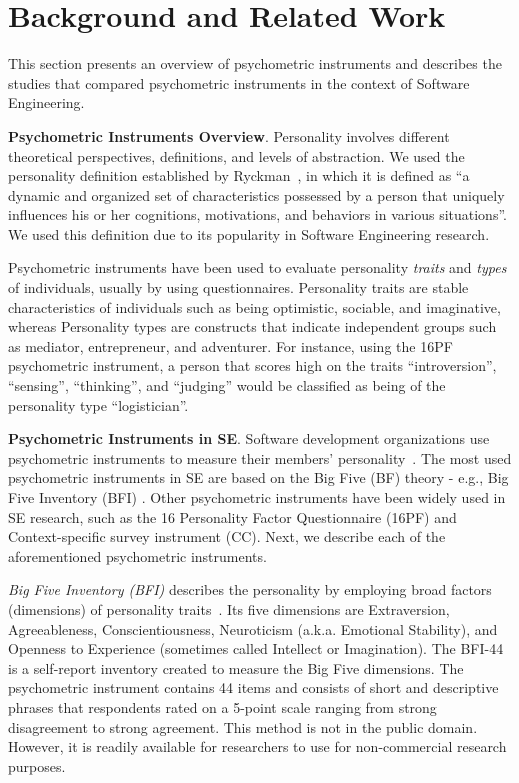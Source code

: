 \section{Background and Related Work}
\label{BACKGROUND}

This section presents an overview of psychometric instruments and describes the studies that compared psychometric instruments in the context of Software Engineering.

\textbf{Psychometric Instruments Overview}. Personality involves different theoretical perspectives, definitions, and levels of abstraction. We used the personality definition established by Ryckman~\cite{ryckman2012theories}, in which it is defined as ``a dynamic and organized set of characteristics possessed by a person that uniquely influences his or her cognitions, motivations, and behaviors in various situations''. We used this definition due to its popularity in Software Engineering research. 

Psychometric instruments have been used to evaluate personality \textit{traits} and \textit{types} of individuals, usually by using questionnaires. Personality traits are stable characteristics of individuals such as being optimistic, sociable, and imaginative, whereas Personality types are constructs that indicate independent groups such as mediator, entrepreneur, and adventurer. For instance, using the 16PF psychometric instrument, a person that scores high on the traits ``introversion'', ``sensing'', ``thinking'', and ``judging'' would be classified as being of the personality type ``logistician''.

\textbf{Psychometric Instruments in SE}. Software development organizations use psychometric instruments to measure their members' personality~\cite{lounsbury2007investigation, wyrich2019theory}. The most used psychometric instruments in SE are based on the Big Five (BF) theory - e.g., Big Five Inventory (BFI) \cite{cruz2015forty}. Other psychometric instruments have been widely used in SE research, such as the 16 Personality Factor Questionnaire (16PF) and Context-specific survey instrument (CC). Next, we describe each of the aforementioned psychometric instruments.

\textit{Big Five Inventory (BFI)} describes the personality by employing broad factors (dimensions) of personality traits~\cite{costa2010neo}. Its five dimensions are Extraversion, Agreeableness, Conscientiousness, Neuroticism (a.k.a. Emotional Stability), and Openness to Experience (sometimes called Intellect or Imagination). The BFI-44 is a self-report inventory created to measure the Big Five dimensions. The psychometric instrument contains 44 items and consists of short and descriptive phrases that respondents rated on a 5-point scale ranging from strong disagreement to strong agreement. This method is not in the public domain. However, it is readily available for researchers to use for non-commercial research purposes. 

